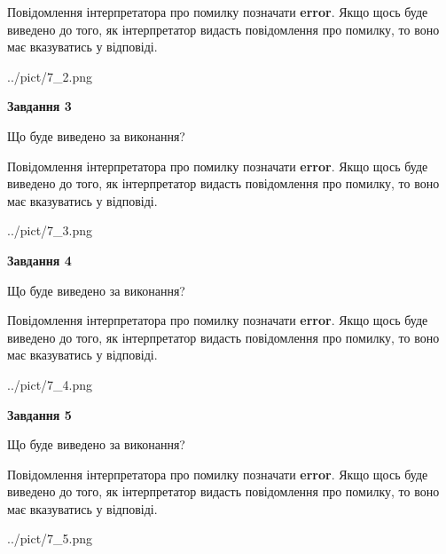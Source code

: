 \documentclass[12pt, ukrainian]{article}
\begin{document}
{\begin {large}
Повідомлення інтерпретатора про помилку позначати \textbf{error}.
Якщо щось буде виведено до того, як інтерпретатор видасть повідомлення про помилку, 
то воно має вказуватись у відповіді. \par


\begin{center}
	{../pict/7_2.png}
\end{center}
\newpage

{\begin {center}\textbf{Завдання 3}\end {center}}\par
Що буде виведено за виконання?

Повідомлення інтерпретатора про помилку позначати \textbf{error}.
Якщо щось буде виведено до того, як інтерпретатор видасть повідомлення про помилку, 
то воно має вказуватись у відповіді. \par


\begin{center}
	{../pict/7_3.png}
\end{center}
\newpage

{\begin {center}\textbf{Завдання 4}\end {center}}\par
Що буде виведено за виконання?

Повідомлення інтерпретатора про помилку позначати \textbf{error}.
Якщо щось буде виведено до того, як інтерпретатор видасть повідомлення про помилку, 
то воно має вказуватись у відповіді. \par


\begin{center}
	{../pict/7_4.png}
\end{center}
\newpage

{\begin {center}\textbf{Завдання 5}\end {center}}\par
Що буде виведено за виконання?

Повідомлення інтерпретатора про помилку позначати \textbf{error}.
Якщо щось буде виведено до того, як інтерпретатор видасть повідомлення про помилку, 
то воно має вказуватись у відповіді. \par


\begin{center}
	{../pict/7_5.png}
\end{center}
\newpage


\end{large}}
\end{document}
